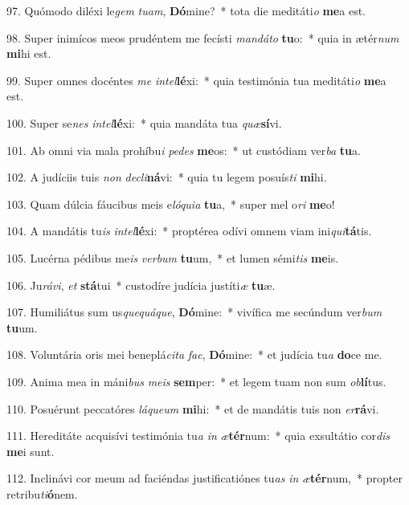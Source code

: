 97. Quómodo diléxi le\textit{gem} \textit{tu}\textit{am}, \textbf{Dó}mine?~*  tota die meditáti\textit{o} \textbf{me}a est.\

98. Super inimícos meos prudéntem me fecísti \textit{man}\textit{dá}\textit{to} \textbf{tu}o:~*  quia in ætér\textit{num} \textbf{mi}hi est.\

99. Super omnes docéntes \textit{me} \textit{in}\textit{tel}\textbf{lé}xi:~*  quia testimónia tua meditáti\textit{o} \textbf{me}a est.\

100. Super se\textit{nes} \textit{in}\textit{tel}\textbf{lé}xi:~*  quia mandáta tua \textit{quæ}\textbf{sí}vi.\

101. Ab omni via mala prohíbu\textit{i} \textit{pe}\textit{des} \textbf{me}os:~*  ut custódiam ver\textit{ba} \textbf{tu}a.\

102. A judíciis tuis \textit{non} \textit{de}\textit{cli}\textbf{ná}vi:~*  quia tu legem posuís\textit{ti} \textbf{mi}hi.\

103. Quam dúlcia fáucibus meis e\textit{ló}\textit{qui}\textit{a} \textbf{tu}a,~*  super mel o\textit{ri} \textbf{me}o!\

104. A mandátis tu\textit{is} \textit{in}\textit{tel}\textbf{lé}xi:~*  proptérea odívi omnem viam ini\textit{qui}\textbf{tá}tis.\

105. Lucérna pédibus me\textit{is} \textit{ver}\textit{bum} \textbf{tu}um,~*  et lumen sémi\textit{tis} \textbf{me}is.\

106. Ju\textit{rá}\textit{vi}, \textit{et} \textbf{stá}tui~*  custodíre judícia justíti\textit{æ} \textbf{tu}æ.\

107. Humiliátus sum us\textit{que}\textit{quá}\textit{que}, \textbf{Dó}mine:~*  vivífica me secúndum ver\textit{bum} \textbf{tu}um.\

108. Voluntária oris mei beneplá\textit{ci}\textit{ta} \textit{fac}, \textbf{Dó}mine:~*  et judícia tu\textit{a} \textbf{do}ce me.\

109. Anima mea in máni\textit{bus} \textit{me}\textit{is} \textbf{sem}per:~*  et legem tuam non sum \textit{ob}\textbf{lí}tus.\

110. Posuérunt peccatóres \textit{lá}\textit{que}\textit{um} \textbf{mi}hi:~*  et de mandátis tuis non \textit{er}\textbf{rá}vi.\

111. Hereditáte acquisívi testimónia tu\textit{a} \textit{in} \textit{æ}\textbf{tér}num:~*  quia exsultátio cor\textit{dis} \textbf{me}i sunt.\

112. Inclinávi cor meum ad faciéndas justificatiónes tu\textit{as} \textit{in} \textit{æ}\textbf{tér}num,~*  propter retribu\textit{ti}\textbf{ó}nem.\

